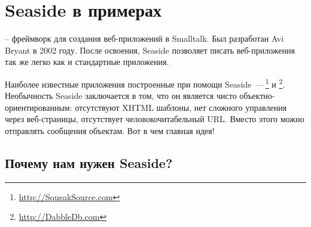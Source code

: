 \documentclass[a4paper,10pt,twoside]{book}
\begin{document}
	\sloppy
\fi

\chapter{Seaside в примерах}




 -- фреймворк для создания веб-приложений в Smalltalk.
Был разработан Avi Bryant  в 2002 году.
После освоения, Seaside позволяет писать веб-приложения так же легко
как и стандартные приложения.


Наиболее известные приложения построенные при помощи \hbox{Seaside}
\,---\,\footnote{\url{http://SqueakSource.com}}
и \footnote{\url{http://DabbleDb.com}}.
Необычность Seaside заключается в том, что он является чисто
объектно-ориентированным: отсутствуют XHTML шаблоны,
нет сложного управления через веб-страницы,
отсутствует человокочитабельный URL.
Вместо этого можно отправлять сообщения объектам.
Вот в чем главная идея!

\section{Почему нам нужен Seaside?}
\end{document}
